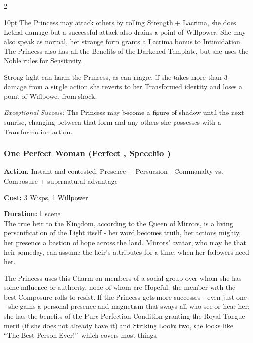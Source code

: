 \begin{multicols}{2}
\begin{myindentpar}{10pt}
	The Princess may attack others by rolling Strength + Lacrima, she does Lethal damage but a successful attack also drains a point of Willpower. She may also speak as normal, her strange form grants a Lacrima bonus to Intimidation. The Princess also has all the Benefits of the Darkened Template, but she uses the Noble rules for Sensitivity. 

	Strong light can harm the Princess, as can magic. If she takes more than 3 damage from a single action she reverts to her Transformed identity and loses a point of Willpower from shock.

    \emph{Exceptional Success:} The Princess may become a figure of shadow until the next sunrise, changing between that form and any others she possesses with a Transformation action.\end{myindentpar}

\subsubsection*{One Perfect Woman (Perfect \textbullet\textbullet\textbullet\textbullet\textbullet, Specchio \textbullet\textbullet\textbullet\textbullet)}

\noindent \textbf{Action:} Instant and contested, Presence + Persuasion - Commonalty vs. Composure + supernatural advantage

\noindent \textbf{Cost:} 3 Wisps, 1 Willpower

\noindent \textbf{Duration:} 1 scene \\
 
\noindent The true heir to the Kingdom, according to the Queen of Mirrors, is a living personification of the Light itself - her word becomes truth, her actions mighty, her presence a bastion of hope across the land. Mirrors' avatar, who may be that heir someday, can assume the heir's attributes for a time, when her followers need her.

The Princess uses this Charm on members of a social group over whom she has some influence or authority, none of whom are Hopeful; the member with the best Composure rolls to resist. If the Princess gets more successes - even just one - she gains a personal presence and magnetism that sways all who see or hear her; she has the benefits of the Pure Perfection Condition granting the Royal Tongue merit (if she does not already have it) and Striking Looks two, she looks like \textquotedblleft The Best Person Ever!\textquotedblright\, which covers most things. 


\end{multicols}
